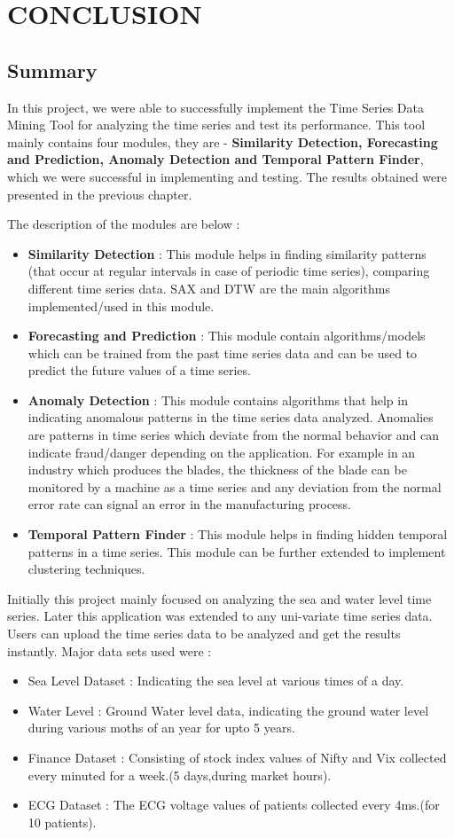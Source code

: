 \documentclass[12pt]{report}
\begin{document}
\chapter{CONCLUSION}
\section{Summary}
In this project, we were able to successfully implement the Time Series Data Mining Tool for analyzing the time series and test its performance. This tool mainly contains four modules, they are - \textbf{Similarity Detection, Forecasting and Prediction, Anomaly Detection and Temporal Pattern Finder}, which we were successful in implementing and testing. The results obtained were presented in the previous chapter.

The description of the modules are below :
\begin{itemize}
\item \textbf{Similarity Detection} : This module helps in finding similarity patterns (that occur at regular intervals in case of periodic time series), comparing different time series data. SAX and DTW are the main algorithms implemented/used in this module.
\item \textbf{Forecasting and Prediction} : This module contain algorithms/models which can be trained from the past time series data and can be used to predict the future values of a time series. 
\item \textbf{Anomaly Detection} : This module contains algorithms that help in indicating anomalous patterns in the time series data analyzed. Anomalies are patterns in time series which deviate from the normal behavior and can indicate fraud/danger depending on the application. For example in an industry which produces the blades, the thickness of the blade can be monitored by a machine as a time series and any deviation from the normal error rate can signal an error in the manufacturing process.
\item \textbf{Temporal Pattern Finder } : This module helps in finding hidden temporal patterns in a time series. This module can be further extended to implement clustering techniques.
\end{itemize}


Initially this project mainly focused on analyzing the sea and water level time series. Later this application was extended to any uni-variate time series data. Users can upload the time series data to be analyzed and get the results instantly. Major data sets used were :
\begin{itemize}
\item Sea Level Dataset : Indicating the sea level at various times of a day.
\item Water Level : Ground Water level data, indicating the ground water level during various moths of an year for upto 5 years.
\item Finance Dataset : Consisting of stock index values of  Nifty and Vix collected every minuted for a week.(5 days,during market hours).
\item ECG Dataset : The ECG  voltage values of patients collected every 4ms.(for 10 patients).
\end{itemize}
\end{document}
